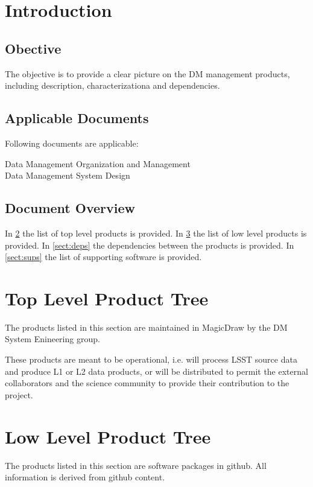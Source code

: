 \section{Introduction}

\subsection{Obective}

The objective is to provide a clear picture on the DM management products, including description, characterizationa and dependencies.

\subsection{Applicable Documents}

Following documents are applicable:

 Data Management Organization and Management\\
 Data Management System Design

\subsection{Document Overview}

In \ref{sect:top} the list of top level products is provided.
In \ref{sect:low} the list of low level products is provided.
In \ref{sect:deps} the dependencies between the products is provided.
In \ref{sect:sups} the list of supporting software is provided.

\newpage
\section{Top Level Product Tree}\label{sect:top}

The products listed in this section are maintained in MagicDraw by the DM System Enineering group. 

These products are meant to be operational, i.e. will process LSST source data and produce L1 or L2 data products, or will be distributed to permit the external collaborators and the science community to provide their contribution to the project.


\section{Low Level Product Tree}\label{sect:low}

The products listed in this section are software packages in github.
All information is derived from github content.

